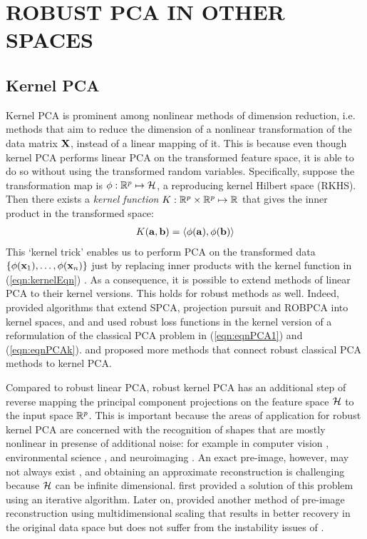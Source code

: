 \section*{\sffamily \Large ROBUST PCA IN OTHER SPACES}
\label{section:Others}

\subsection*{\sffamily \large Kernel PCA}
Kernel PCA is prominent among nonlinear methods of dimension reduction, i.e. methods that aim to reduce the dimension of a nonlinear transformation of the data matrix ${\mathbf{X}}$, instead of a linear mapping of it. This is because even though kernel PCA performs linear PCA on the transformed feature space, it is able to do so without using the transformed random variables. Specifically, suppose the transformation map is $\phi: {\mathbb{R}}^p \mapsto {\cal{H}}$, a reproducing kernel Hilbert space (RKHS). Then there exists a {\it kernel function} $K: {\mathbb{R}}^p \times {\mathbb{R}}^p \mapsto {\mathbb{R}}$ that gives the inner product in the transformed space:
%
\begin{align}\label{eqn:kernelEqn}
K( {\bf{a}}, {\bf{b}}) = \langle \phi({\bf{a}}), \phi({\bf{b}}) \rangle
\end{align}
%
This `kernel trick' enables us to perform PCA on the transformed data $\{ \phi({\bf{x}}_1), \ldots, \phi({\bf{x}}_n) \}$ just by replacing inner products with the kernel function in (\ref{eqn:kernelEqn}) \citep{Scholkopf99}. As a consequence, it is possible to extend methods of linear PCA to their kernel versions. This holds for robust methods as well. Indeed, \cite{DeBruyneVerdonck10,DebruyneEtal10} provided algorithms that extend SPCA, projection pursuit and ROBPCA into kernel spaces, and \cite{Yangetal14,HuangEtal09} and \cite{HuangReh11} used robust loss functions in the kernel version of a reformulation of the classical PCA problem in (\ref{eqn:eqnPCA1}) and (\ref{eqn:eqnPCAk}). \cite{WangEtal07, DengEtal07} and \cite{PangEtal10} proposed more methods that connect robust classical PCA methods to kernel PCA.

Compared to robust linear PCA, robust kernel PCA has an additional step of reverse mapping the principal component projections on the feature space ${\cal{H}}$ to the input space ${\mathbb{R}}^p$. This is important because the areas of application for robust kernel PCA are concerned with the recognition of shapes that are mostly nonlinear in presense of additional noise: for example in computer vision \citep{Lampart08}, environmental science \citep{HsiehBook}, and neuroimaging \citep{MwangiEtal14}. An exact pre-image, however, may not always exist \citep{Mikaetal99}, and obtaining an approximate reconstruction is challenging because ${\cal{H}}$ can be infinite dimensional. \cite{Mikaetal99} first provided a solution of this problem using an iterative algorithm. Later on, \cite{KwokTsang03} provided another method of pre-image reconstruction using multidimensional scaling that results in better recovery in the original data space but does not suffer from the instability issues of \cite{Mikaetal99}.

